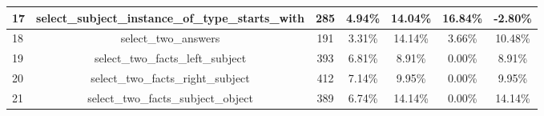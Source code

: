\begin{table}[h!]
{\begin{tabular}{|l|c|cc|cc|c|}
    17                           & select\_subject\_instance\_of\_type\_starts\_with                                                                      & 285                                                 & 4.94\%                                                                          & 14.04\%                                                                                                    & 16.84\%                                                                                & \textbf{-2.80\%}                        \\ \hline
    18                           & select\_two\_answers                                                                                                   & 191                                                 & 3.31\%                                                                          & 14.14\%                                                                                                    & 3.66\%                                                                                 & 10.48\%                                 \\ \hline
    19                           & select\_two\_facts\_left\_subject                                                                                      & 393                                                 & 6.81\%                                                                          & 8.91\%                                                                                                     & 0.00\%                                                                                 & 8.91\%                                  \\ \hline
    20                           & select\_two\_facts\_right\_subject                                                                                     & 412                                                 & 7.14\%                                                                          & 9.95\%                                                                                                     & 0.00\%                                                                                 & 9.95\%                                  \\ \hline
    21                           & select\_two\_facts\_subject\_object                                                                                    & 389                                                 & 6.74\%                                                                          & 14.14\%                                                                                                    & 0.00\%                                                                                 & 14.14\%                                 \\ \hline

\end{tabular}}
\end{table}
